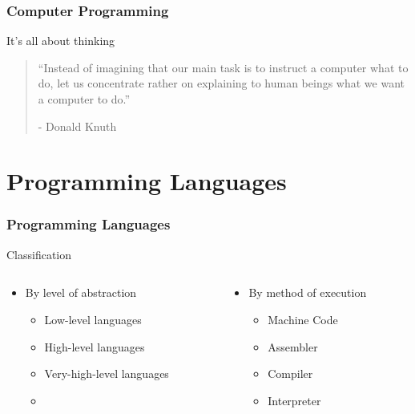 \documentclass[10pt, compress]{beamer}
\begin{document}
\begin{frame}[fragile]
	\frametitle{Computer Programming}
	\begin{block}{It's all about thinking}
		\begin{quote}
		``Instead of imagining that our main task is to instruct a computer what to do, let us concentrate rather on explaining to human beings what we want a computer to do.''
		\begin{flushright}
		- Donald Knuth
		\end{flushright}
		\end{quote}
	\end{block}
\end{frame}

\section{Programming Languages}

\begin{frame}[fragile]
	\frametitle{Programming Languages}
	\begin{block}{Classification}
		\begin{columns}
			\begin{column}{0.5\textwidth}
			\begin{itemize}
				\item[] By level of abstraction
				\begin{itemize}
					\item[] Low-level languages
					\item[] High-level languages
					\item[] Very-high-level languages
					\item[]
				\end{itemize}
			\end{itemize}
			\end{column}
			\begin{column}{0.5\textwidth}
			\begin{itemize}
				\item[] By method of execution
				\begin{itemize}
					\item[] Machine Code
					\item[] Assembler
					\item[] Compiler
					\item[] Interpreter
				\end{itemize}
			\end{itemize}
			\end{column}
		\end{columns}
	\end{block}
\end{frame}
\end{document}
